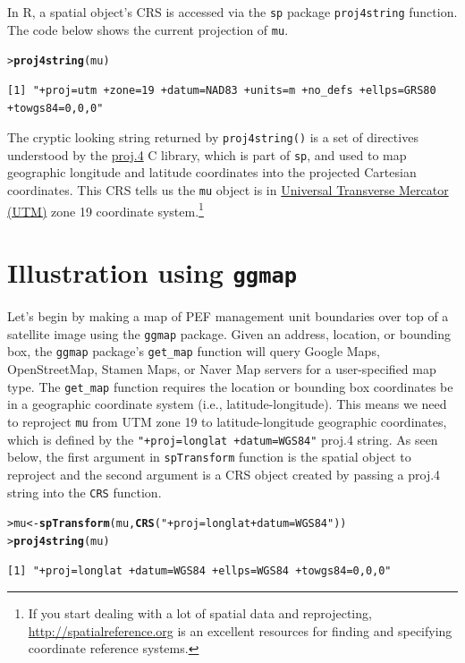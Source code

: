\documentclass[12pt,oneside]{book}\usepackage[]{graphicx}\usepackage[]{color}
\makeatletter
\newcommand{\hlstr}[1]{\textcolor[rgb]{0.192,0.494,0.8}{#1}}%
\newcommand{\hlstd}[1]{\textcolor[rgb]{0.345,0.345,0.345}{#1}}%
\newcommand{\hlkwb}[1]{\textcolor[rgb]{0.69,0.353,0.396}{#1}}%
\newcommand{\hlkwd}[1]{\textcolor[rgb]{0.737,0.353,0.396}{\textbf{#1}}}%
\newenvironment{kframe}{%
 \def\at@end@of@kframe{}%
 \ifinner\ifhmode%
  \def\at@end@of@kframe{\end{minipage}}%
  \begin{minipage}{\columnwidth}%
 \fi\fi%
 \def\FrameCommand##1{\hskip\@totalleftmargin \hskip-\fboxsep
 \colorbox{shadecolor}{##1}\hskip-\fboxsep
     \hskip-\linewidth \hskip-\@totalleftmargin \hskip\columnwidth}%
 \MakeFramed {\advance\hsize-\width
   \@totalleftmargin\z@ \linewidth\hsize
   \@setminipage}}%
 {\par\unskip\endMakeFramed%
 \at@end@of@kframe}
\newenvironment{knitrout}{}{} %
\makeatother
\begin{document}
In R, a spatial object's CRS is accessed via the \verb+sp+ package \verb+proj4string+ function. The code below shows the current projection of \verb+mu+.
\begin{knitrout}
\color{fgcolor}\begin{kframe}
\begin{alltt}
\hlstd{> }\hlkwd{proj4string}\hlstd{(mu)}
\end{alltt}
\begin{verbatim}
[1] "+proj=utm +zone=19 +datum=NAD83 +units=m +no_defs +ellps=GRS80 +towgs84=0,0,0"
\end{verbatim}
\end{kframe}
\end{knitrout}
The cryptic looking string returned by \verb+proj4string()+ is a set of directives understood by the \href{http://proj4.org/}{proj.4} C library, which is part of \verb+sp+, and used to map geographic longitude and latitude coordinates into the projected Cartesian coordinates. This CRS tells us the \verb+mu+ object is in \href{https://en.wikipedia.org/wiki/Universal_Transverse_Mercator_coordinate_system}{Universal Transverse Mercator (UTM)} zone 19 coordinate system.\footnote{If you start dealing with a lot of spatial data and reprojecting, \url{http://spatialreference.org} is an excellent resources for finding and specifying coordinate reference systems.}

\section{Illustration using \texttt{ggmap}}\label{sec:ggmap}
Let's begin by making a map of PEF management unit boundaries over top of a satellite image using the \verb+ggmap+ package. Given an address, location, or bounding box, the \verb+ggmap+ package's \verb+get_map+ function will query Google Maps, OpenStreetMap, Stamen Maps, or Naver Map servers for a user-specified map type. The \verb+get_map+ function requires the location or bounding box coordinates be in a geographic coordinate system (i.e., latitude-longitude). This means we need to reproject \verb+mu+ from UTM zone 19 to latitude-longitude geographic coordinates, which is defined by the \verb'"+proj=longlat +datum=WGS84"' proj.4 string. As seen below, the first argument in \verb+spTransform+ function is the spatial object to reproject and the second argument is a CRS object created by passing a proj.4 string into the \verb+CRS+ function.
\begin{knitrout}
\color{fgcolor}\begin{kframe}
\begin{alltt}
\hlstd{> }\hlstd{mu} \hlkwb{<-} \hlkwd{spTransform}\hlstd{(mu,} \hlkwd{CRS}\hlstd{(}\hlstr{"+proj=longlat +datum=WGS84"}\hlstd{))}
\hlstd{> }\hlkwd{proj4string}\hlstd{(mu)}
\end{alltt}
\begin{verbatim}
[1] "+proj=longlat +datum=WGS84 +ellps=WGS84 +towgs84=0,0,0"
\end{verbatim}
\end{kframe}
\end{knitrout}
\end{document}
